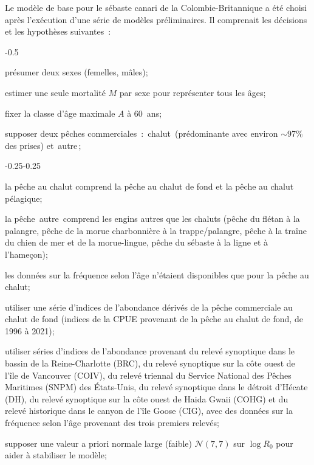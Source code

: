 \documentclass[11pt]{book}
\newcommand{\pc}{\%}
\newcommand{\angL}{\guillemotleft\,}
\newcommand{\angR}{\,\guillemotright}
\begin{document}
Le mod\`{e}le de base pour le s\'{e}baste canari de la Colombie-Britannique a \'{e}t\'{e} choisi apr\`{e}s l'ex\'{e}cution d'une s\'{e}rie de mod\`{e}les pr\'{e}liminaires. Il comprenait les d\'{e}cisions et les hypoth\`{e}ses suivantes~: \begin{itemize_csas}{-0.5}{}
  \item pr\'{e}sumer deux sexes (femelles, m\^{a}les);
  \item estimer une seule mortalit\'{e} $M$ par sexe pour repr\'{e}senter tous les \^{a}ges;
  \item fixer la classe d'\^{a}ge maximale $A$ \`{a} 60~ans;
  \item supposer deux p\^{e}ches commerciales~: \angL{}chalut\angR{} (pr\'{e}dominante avec environ $\sim$97\pc{} des prises) et \angL{}autre\angR{};
  \begin{itemize_csas}{-0.25}{-0.25}
    \item la p\^{e}che au chalut comprend la p\^{e}che au chalut de fond et la p\^{e}che au chalut p\'{e}lagique;
    \item la p\^{e}che \angL{}autre\angR{} comprend les engins autres que les chaluts (p\^{e}che du fl\'{e}tan \`{a} la palangre, p\^{e}che de la morue charbonni\`{e}re \`{a} la trappe/palangre, p\^{e}che \`{a} la tra\^{i}ne du chien de mer et de la morue-lingue, p\^{e}che du s\'{e}baste \`{a} la ligne et \`{a} l'hame\c{c}on);
    \item les donn\'{e}es sur la fr\'{e}quence selon l'\^{a}ge n'\'{e}taient disponibles que pour la p\^{e}che au chalut;
  \end{itemize_csas}
  \item utiliser une s\'{e}rie d'indices de l'abondance d\'{e}riv\'{e}s de la p\^{e}che commerciale au chalut de fond (indices de la CPUE provenant de la p\^{e}che au chalut de fond, de 1996 \`{a} 2021);
  \item utiliser  s\'{e}ries d'indices de l'abondance provenant du relev\'{e} synoptique dans le bassin de la Reine-Charlotte (BRC), du relev\'{e} synoptique sur la c\^{o}te ouest de l'\^{i}le de Vancouver (COIV), du relev\'{e} triennal du Service National des P\^{e}ches Maritimes (SNPM) des \'{E}tats-Unis, du relev\'{e} synoptique dans le d\'{e}troit d'H\'{e}cate (DH), du relev\'{e} synoptique sur la c\^{o}te ouest de Haida Gwaii (COHG) et du relev\'{e} historique dans le canyon de l'\^{i}le Goose (CIG), avec des donn\'{e}es sur la fr\'{e}quence selon l'\^{a}ge provenant des trois premiers relev\'{e}s;
  \item supposer une valeur a priori normale large (faible) $\mathcal{N}(7,7)$ sur $\log R_0$ pour aider \`{a} stabiliser le mod\`{e}le; 

\end{itemize_csas}
\end{document}
